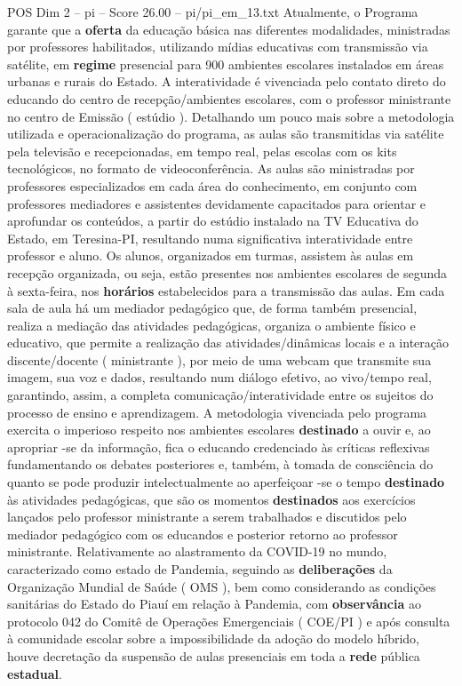 \begin{textsample}{POS Dim 2 – pi – Score 26.00 – pi/pi\_em\_13.txt}
Atualmente, o Programa garante que a \textbf{oferta} da educação básica nas diferentes modalidades, ministradas por professores habilitados, utilizando mídias educativas com transmissão via satélite, em \textbf{regime} presencial para 900 ambientes escolares instalados em áreas urbanas e rurais do Estado.
A interatividade é vivenciada pelo contato direto do educando do centro de recepção/ambientes escolares, com o professor ministrante no centro de Emissão ( estúdio ).
Detalhando um pouco mais sobre a metodologia utilizada e operacionalização do programa, as aulas são transmitidas via satélite pela televisão e recepcionadas, em tempo real, pelas escolas com os kits tecnológicos, no formato de videoconferência.
As aulas são ministradas por professores especializados em cada área do conhecimento, em conjunto com professores mediadores e assistentes devidamente capacitados para orientar e aprofundar os conteúdos, a partir do estúdio instalado na TV Educativa do Estado, em Teresina-PI, resultando numa significativa interatividade entre professor e aluno.
Os alunos, organizados em turmas, assistem às aulas em recepção organizada, ou seja, estão presentes nos ambientes escolares de segunda à sexta-feira, nos \textbf{horários} estabelecidos para a transmissão das aulas.
Em cada sala de aula há um mediador pedagógico que, de forma também presencial, realiza a mediação das atividades pedagógicas, organiza o ambiente físico e educativo, que permite a realização das atividades/dinâmicas locais e a interação discente/docente ( ministrante ), por meio de uma webcam que transmite sua imagem, sua voz e dados, resultando num diálogo efetivo, ao vivo/tempo real, garantindo, assim, a completa comunicação/interatividade entre os sujeitos do processo de ensino e aprendizagem.
A metodologia vivenciada pelo programa exercita o imperioso respeito nos ambientes escolares \textbf{destinado} a ouvir e, ao apropriar -se da informação, fica o educando credenciado às críticas reflexivas fundamentando os debates posteriores e, também, à tomada de consciência do quanto se pode produzir intelectualmente ao aperfeiçoar -se o tempo \textbf{destinado} às atividades pedagógicas, que são os momentos \textbf{destinados} aos exercícios lançados pelo professor ministrante a serem trabalhados e discutidos pelo mediador pedagógico com os educandos e posterior retorno ao professor ministrante.
Relativamente ao alastramento da COVID-19 no mundo, caracterizado como estado de Pandemia, seguindo as \textbf{deliberações} da Organização Mundial de Saúde ( OMS ), bem como considerando as condições sanitárias do Estado do Piauí em relação à Pandemia, com \textbf{observância} ao protocolo 042 do Comitê de Operações Emergenciais ( COE/PI ) e após consulta à comunidade escolar sobre a impossibilidade da adoção do modelo híbrido, houve decretação da suspensão de aulas presenciais em toda a \textbf{rede} pública \textbf{estadual}.

\end{textsample}
